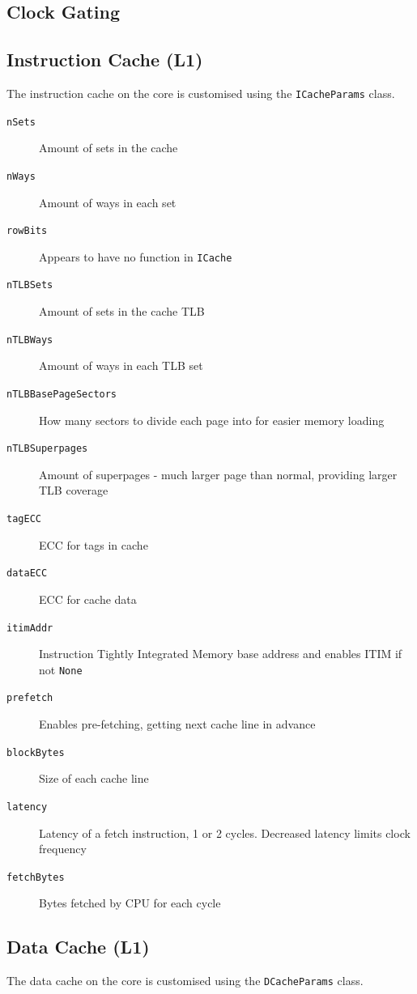 \subsection{Clock Gating} %

\subsection{Instruction Cache (L1)}
The instruction cache on the core is customised using the \texttt{ICacheParams} class.

\begin{description}
    \item[\texttt{nSets}] Amount of sets in the cache
    \item[\texttt{nWays}] Amount of ways in each set
    \item[\texttt{rowBits}] Appears to have no function in \texttt{ICache}
    \item[\texttt{nTLBSets}] Amount of sets in the cache TLB
    \item[\texttt{nTLBWays}] Amount of ways in each TLB set
    \item[\texttt{nTLBBasePageSectors}] How many sectors to divide each page into for easier memory loading
    \item[\texttt{nTLBSuperpages}] Amount of superpages - much larger page than normal, providing larger TLB coverage
    \item[\texttt{tagECC}] ECC for tags in cache
    \item[\texttt{dataECC}] ECC for cache data
    \item[\texttt{itimAddr}] Instruction Tightly Integrated Memory base address and enables ITIM if not \texttt{None}
    \item[\texttt{prefetch}] Enables pre-fetching, getting next cache line in advance
    \item[\texttt{blockBytes}] Size of each cache line
    \item[\texttt{latency}] Latency of a fetch instruction, 1 or 2 cycles. Decreased latency limits clock frequency
    \item[\texttt{fetchBytes}] Bytes fetched by CPU for each cycle
\end{description}

\subsection{Data Cache (L1)}
The data cache on the core is customised using the \texttt{DCacheParams} class.

